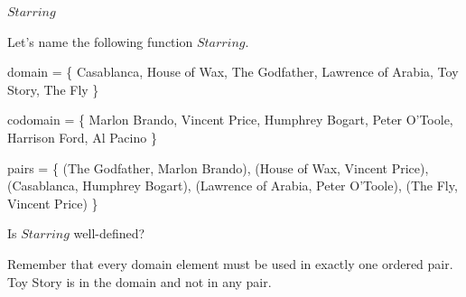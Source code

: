 \documentclass{ximera}
\begin{document}
\begin{example} $Starring$

Let's name the following function $Starring$.

domain = \{ Casablanca, House of Wax,  The Godfather, Lawrence of Arabia, Toy Story, The Fly \}

codomain = \{ Marlon Brando, Vincent Price, Humphrey Bogart, Peter O'Toole, Harrison Ford, Al Pacino \}

pairs = \{ (The Godfather, Marlon Brando), (House of Wax, Vincent Price), (Casablanca, Humphrey Bogart), (Lawrence of Arabia, Peter O'Toole), (The Fly, Vincent Price) \} 





\begin{question}

Is $Starring$ well-defined?

\begin{multipleChoice}
\end{multipleChoice}
\begin{feedback}
Remember that every domain element must be used in exactly one ordered pair. Toy Story is in the domain and not in any pair.
\end{feedback}

\end{question}



\end{example}
\end{document}
